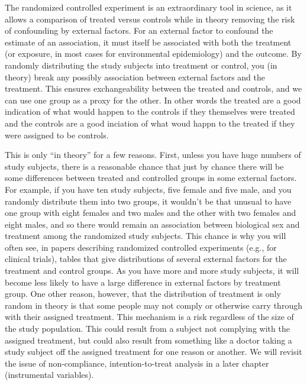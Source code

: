 \documentclass[
]{book}
\begin{document}
The randomized controlled experiment is an extraordinary tool in science, as it allows a comparison of treated versus controls while in theory removing the risk of confounding by external factors. For an external factor to confound the estimate of an association, it must itself be associated with both the treatment (or exposure, in most cases for environmental epidemiology) and the outcome. By randomly distributing the study subjects into treatment or control, you (in theory) break any possibly association between external factors and the treatment. This ensures exchangeability between the treated and controls, and we can use one group as a proxy for the other. In other words the treated are a good indication of what would happen to the controls if they themselves were treated and the controls are a good inciation of what woud happn to the treated if they were assigned to be controls.

This is only ``in theory'' for a few reasons. First, unless you have huge numbers of study subjects, there is a reasonable chance that just by chance there will be some differences between treated and controlled groups in some external factors. For example, if you have ten study subjects, five female and five male, and you randomly distribute them into two groups, it wouldn't be that unusual to have one group with eight females and two males and the other with two females and eight males, and so there would remain an association between biological sex and treatment among the randomized study subjects. This chance is why you will often see, in papers describing randomized controlled experiments (e.g., for clinical trials), tables that give distributions of several external factors for the treatment and control groups. As you have more and more study subjects, it will become less likely to have a large difference in external factors by treatment group. One other reason, however, that the distribution of treatment is only random in theory is that some people may not comply or otherwise carry through with their assigned treatment. This mechanism is a risk regardless of the size of the study population. This could result from a subject not complying with the assigned treatment, but could also result from something like a doctor taking a study subject off the assigned treatment for one reason or another. We will revisit the issue of non-compliance, intention-to-treat analysis in a later chapter (instrumental variables).
\end{document}
